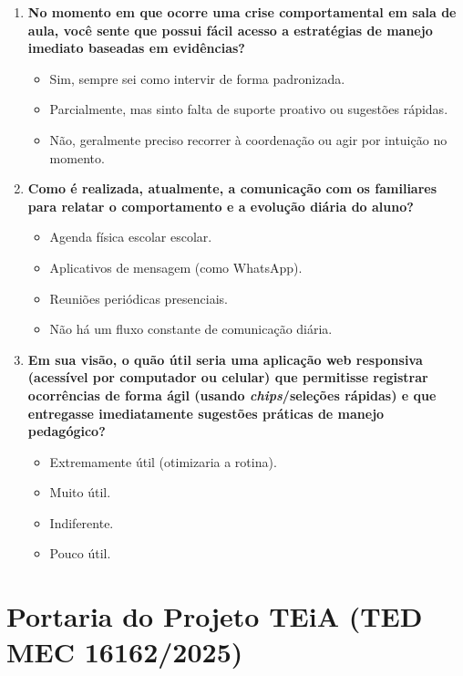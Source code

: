 \documentclass[%
    	        oneside,                   %
]{configuracoes/norma-abntex2}
\begin{document}
\begin{apendicesenv}
\begin{enumerate}
    \item \textbf{No momento em que ocorre uma crise comportamental em sala de aula, você sente que possui fácil acesso a estratégias de manejo imediato baseadas em evidências?}
    \begin{itemize}
        \item[ ] Sim, sempre sei como intervir de forma padronizada.
        \item[ ] Parcialmente, mas sinto falta de suporte proativo ou sugestões rápidas.
        \item[ ] Não, geralmente preciso recorrer à coordenação ou agir por intuição no momento.
    \end{itemize}

    \item \textbf{Como é realizada, atualmente, a comunicação com os familiares para relatar o comportamento e a evolução diária do aluno?}
    \begin{itemize}
        \item[ ] Agenda física escolar escolar.
        \item[ ] Aplicativos de mensagem (como WhatsApp).
        \item[ ] Reuniões periódicas presenciais.
        \item[ ] Não há um fluxo constante de comunicação diária.
    \end{itemize}

    \item \textbf{Em sua visão, o quão útil seria uma aplicação web responsiva (acessível por computador ou celular) que permitisse registrar ocorrências de forma ágil (usando \textit{chips}/seleções rápidas) e que entregasse imediatamente sugestões práticas de manejo pedagógico?}
    \begin{itemize}
        \item[ ] Extremamente útil (otimizaria a rotina).
        \item[ ] Muito útil.
        \item[ ] Indiferente.
        \item[ ] Pouco útil.
    \end{itemize}
\end{enumerate}

\chapter{Portaria do Projeto TEiA (TED MEC 16162/2025)}
\label{apendice:portaria_teia}


\end{apendicesenv}
\end{document}
